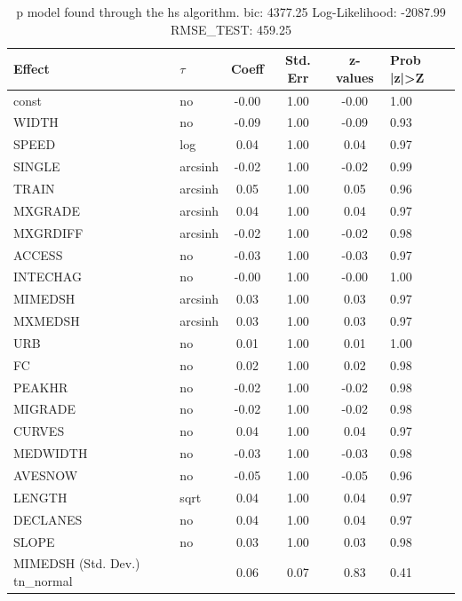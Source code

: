 \begin{table}
	\caption{p model found through the hs algorithm. bic: 4377.25 Log-Likelihood: -2087.99 RMSE_TEST: 459.25}
	\begin{center}
		\begin{tabular}{|l|l|c|c|c|l|}
			\hline
			Effect & $\tau$ & Coeff & Std. Err & z-values & Prob |z|>Z \\
			\hline
			const & no & -0.00 & 1.00 & -0.00 & 1.00 \\
			\hline
			WIDTH & no & -0.09 & 1.00 & -0.09 & 0.93 \\
			\hline
			SPEED & log & 0.04 & 1.00 & 0.04 & 0.97 \\
			\hline
			SINGLE & arcsinh & -0.02 & 1.00 & -0.02 & 0.99 \\
			\hline
			TRAIN & arcsinh & 0.05 & 1.00 & 0.05 & 0.96 \\
			\hline
			MXGRADE & arcsinh & 0.04 & 1.00 & 0.04 & 0.97 \\
			\hline
			MXGRDIFF & arcsinh & -0.02 & 1.00 & -0.02 & 0.98 \\
			\hline
			ACCESS & no & -0.03 & 1.00 & -0.03 & 0.97 \\
			\hline
			INTECHAG & no & -0.00 & 1.00 & -0.00 & 1.00 \\
			\hline
			MIMEDSH & arcsinh & 0.03 & 1.00 & 0.03 & 0.97 \\
			\hline
			MXMEDSH & arcsinh & 0.03 & 1.00 & 0.03 & 0.97 \\
			\hline
			URB & no & 0.01 & 1.00 & 0.01 & 1.00 \\
			\hline
			FC & no & 0.02 & 1.00 & 0.02 & 0.98 \\
			\hline
			PEAKHR & no & -0.02 & 1.00 & -0.02 & 0.98 \\
			\hline
			MIGRADE & no & -0.02 & 1.00 & -0.02 & 0.98 \\
			\hline
			CURVES & no & 0.04 & 1.00 & 0.04 & 0.97 \\
			\hline
			MEDWIDTH & no & -0.03 & 1.00 & -0.03 & 0.98 \\
			\hline
			AVESNOW & no & -0.05 & 1.00 & -0.05 & 0.96 \\
			\hline
			LENGTH & sqrt & 0.04 & 1.00 & 0.04 & 0.97 \\
			\hline
			DECLANES & no & 0.04 & 1.00 & 0.04 & 0.97 \\
			\hline
			SLOPE & no & 0.03 & 1.00 & 0.03 & 0.98 \\
			\hline
			MIMEDSH (Std. Dev.) tn_normal &  & 0.06 & 0.07 & 0.83 & 0.41 \\
			\hline

\end{tabular}
\end{center}
\end{table}
